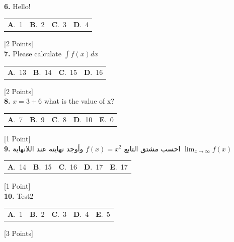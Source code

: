 \documentclass[12pt]{article}
\newcommand{\choice}[2]{\textbf{#1}.~#2}
\begin{document}
\noindent \textbf{\textenglish{6.}} {\textenglish{Hello!}}

\begin{tabularx}{\linewidth}{@{}*{4}{Y}@{}}
\choice{A}{{{\textenglish{1}}}} & \choice{B}{{{\textenglish{2}}}} & \choice{C}{{{\textenglish{3}}}} & \choice{D}{{{\textenglish{4}}}} \\
\end{tabularx}
\hfill {\textenglish{[2 Points]}}\\[0.5em]

\noindent \textbf{\textenglish{7.}} {\textenglish{Please calculate }}\(\int f(x)dx\)

\begin{tabularx}{\linewidth}{@{}*{4}{Y}@{}}
\choice{A}{{{\textenglish{13}}}} & \choice{B}{{{\textenglish{14}}}} & \choice{C}{{{\textenglish{15}}}} & \choice{D}{{{\textenglish{16}}}} \\
\end{tabularx}
\hfill {\textenglish{[2 Points]}}\\[0.5em]

\noindent \textbf{\textenglish{8.}} \(x=3+6 \){\textenglish{ what is the value of x?}}

\begin{tabularx}{\linewidth}{@{}*{5}{Y}@{}}
\choice{A}{{{\textenglish{7}}}} & \choice{B}{{{\textenglish{9}}}} & \choice{C}{{{\textenglish{8}}}} & \choice{D}{{{\textenglish{10}}}} & \choice{E}{{{\textenglish{0}}}} \\
\end{tabularx}
\hfill {\textenglish{[1 Point]}}\\[0.5em]

\noindent \textbf{\textenglish{9.}} {\textarabic{احسب مشتق التابع }}\( f(x) = x^2\){\textarabic{ وأوجد نهايته عند اللانهاية }}\(\lim_{x \to \infty}f(x)\)

\begin{tabularx}{\linewidth}{@{}*{5}{Y}@{}}
\choice{A}{{{\textenglish{14}}}} & \choice{B}{{{\textenglish{15}}}} & \choice{C}{{{\textenglish{16}}}} & \choice{D}{{{\textenglish{17}}}} & \choice{E}{{{\textenglish{17}}}} \\
\end{tabularx}
\hfill {\textenglish{[1 Point]}}\\[0.5em]

\noindent \textbf{\textenglish{10.}} {\textenglish{Test2}}

\begin{tabularx}{\linewidth}{@{}*{5}{Y}@{}}
\choice{A}{{{\textenglish{1}}}} & \choice{B}{{{\textenglish{2}}}} & \choice{C}{{{\textenglish{3}}}} & \choice{D}{{{\textenglish{4}}}} & \choice{E}{{{\textenglish{5}}}} \\
\end{tabularx}
\hfill {\textenglish{[3 Points]}}\\[0.5em]
\end{document}
